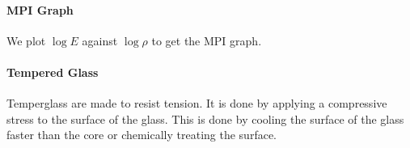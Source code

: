 \documentclass[11pt]{article}
\begin{document}
\paragraph{MPI Graph} We plot $\log E$ against $\log \rho$ to get the MPI graph. 
\paragraph{Tempered Glass} Temperglass are made to resist tension. It is done by applying a compressive stress to the surface of the glass. This is done by cooling the surface of the glass faster than the core or chemically treating the surface.
\appendix

\end{document}
